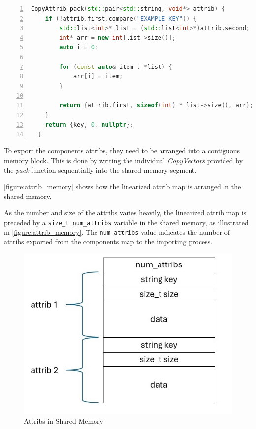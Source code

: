 \begin{lstlisting}[language=c++, numbers=left, caption=Example Packing Function, captionpos=b, label={lst:packing_function}]
  CopyAttrib pack(std::pair<std::string, void*> attrib) {
    if (!attrib.first.compare("EXAMPLE_KEY")) {
        std::list<int>* list = (std::list<int>*)attrib.second;
        int* arr = new int[list->size()];
        auto i = 0;

        for (const auto& item : *list) {
            arr[i] = item;
        }

        return {attrib.first, sizeof(int) * list->size(), arr};
    }
    return {key, 0, nullptr};
  }
\end{lstlisting}

To export the components attribs, they need to be arranged into a contiguous memory block.
This is done by writing the individual \emph{CopyVectors} provided by the \emph{pack} function sequentially into the shared memory segment.

\autoref{figure:attrib_memory} shows how the linearized attrib map is arranged in the shared memory.

As the number and size of the attribs varies heavily, the linearized attrib map is preceded by a \lstinline|size_t num_attribs| variable in the shared memory,
as illustrated in \autoref{figure:attrib_memory}.
The \lstinline|num_attribs| value indicates the number of attribs exported from the components map to the importing process.

\begin{figure}[!ht]
    \includegraphics[scale=0.7]{images/attrib_memory.jpg}
    \centering
    \caption{Attribs in Shared Memory}
    \label{figure:attrib_memory}
\end{figure}

